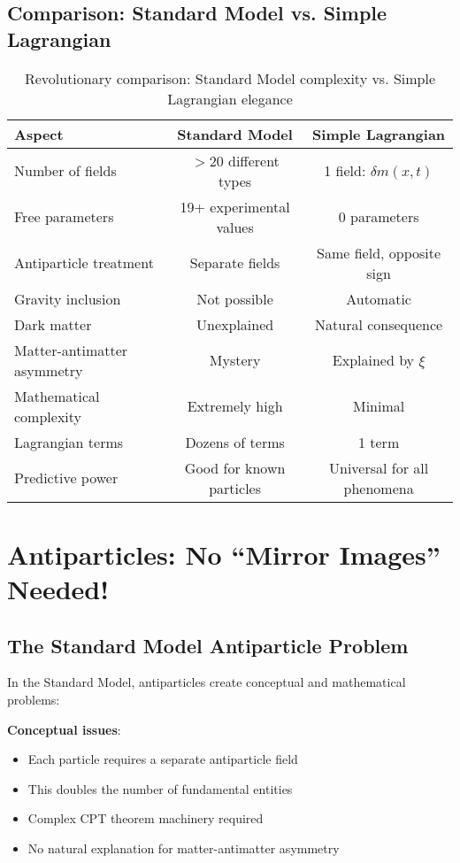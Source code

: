 \documentclass[12pt,a4paper]{article}
\newcommand{\deltam}{\delta m}
\newcommand{\xipar}{\xi}
\theoremstyle{definition}
\theoremstyle{remark}
\begin{document}
	\subsection{Comparison: Standard Model vs. Simple Lagrangian}
	
	\begin{table}[htbp]
		\centering
		\begin{tabular}{lcc}
			\toprule
			\textbf{Aspect} & \textbf{Standard Model} & \textbf{Simple Lagrangian} \\
			\midrule
			Number of fields & $>$20 different types & 1 field: $\deltam(x,t)$ \\
			Free parameters & 19+ experimental values & 0 parameters \\
			Antiparticle treatment & Separate fields & Same field, opposite sign \\
			Gravity inclusion & Not possible & Automatic \\
			Dark matter & Unexplained & Natural consequence \\
			Matter-antimatter asymmetry & Mystery & Explained by $\xipar$ \\
			Mathematical complexity & Extremely high & Minimal \\
			Lagrangian terms & Dozens of terms & 1 term \\
			Predictive power & Good for known particles & Universal for all phenomena \\
			\bottomrule
		\end{tabular}
		\caption{Revolutionary comparison: Standard Model complexity vs. Simple Lagrangian elegance}
		\label{tab:sm_simple_comparison}
	\end{table}
	
	\section{Antiparticles: No ``Mirror Images'' Needed!}
	
	\subsection{The Standard Model Antiparticle Problem}
	
	In the Standard Model, antiparticles create conceptual and mathematical problems:
	
	\textbf{Conceptual issues}:
	\begin{itemize}
		\item Each particle requires a separate antiparticle field
		\item This doubles the number of fundamental entities
		\item Complex CPT theorem machinery required
		\item No natural explanation for matter-antimatter asymmetry
	\end{itemize}
	
\end{document}
